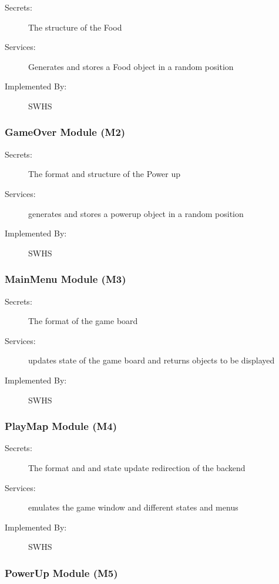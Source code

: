 \documentclass[12pt]{article}
\begin{document}
\begin{description}
\color{blue}
\item[Secrets:]The structure of the Food
\item[Services:] Generates and stores a Food object in a random position
\item[Implemented By:] SWHS
\end{description}
\subsubsection{GameOver Module (M2)}

\begin{description}

\item[Secrets:]The format and structure of the Power up
\item[Services:]generates and stores a powerup object in a random position
\item[Implemented By:] SWHS
\end{description}

\subsubsection{MainMenu Module (M3)}

\begin{description}



\item[Secrets:] The format of the game board
\item[Services:] updates state of the game board and returns objects to be displayed
\item[Implemented By:] SWHS
\end{description} 

\subsubsection{PlayMap Module (M4)}


\begin{description}
\item[Secrets:] The format and and state update redirection of the backend
\item[Services:] emulates the game window and different states and menus
\item[Implemented By:] SWHS
\end{description} 

\subsubsection{PowerUp Module (M5)}
\end{document}
